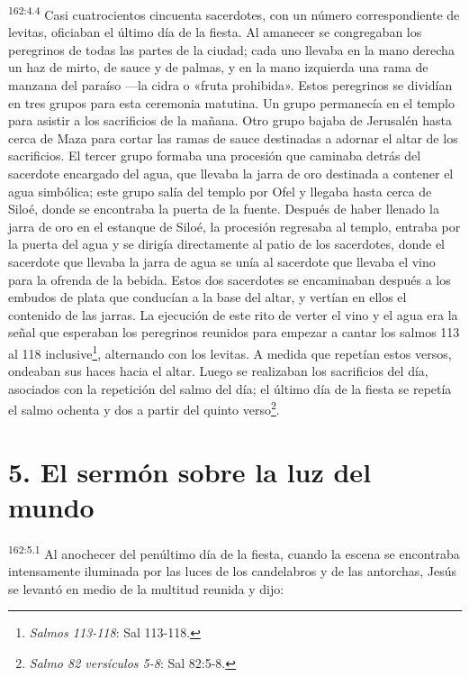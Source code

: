 \par
\textsuperscript{162:4.4} Casi cuatrocientos cincuenta sacerdotes, con un número correspondiente de levitas, oficiaban el último día de la fiesta. Al amanecer se congregaban los peregrinos de todas las partes de la ciudad; cada uno llevaba en la mano derecha un haz de mirto, de sauce y de palmas, y en la mano izquierda una rama de manzana del paraíso ---la cidra o «fruta prohibida». Estos peregrinos se dividían en tres grupos para esta ceremonia matutina. Un grupo permanecía en el templo para asistir a los sacrificios de la mañana. Otro grupo bajaba de Jerusalén hasta cerca de Maza para cortar las ramas de sauce destinadas a adornar el altar de los sacrificios. El tercer grupo formaba una procesión que caminaba detrás del sacerdote encargado del agua, que llevaba la jarra de oro destinada a contener el agua simbólica; este grupo salía del templo por Ofel y llegaba hasta cerca de Siloé, donde se encontraba la puerta de la fuente. Después de haber llenado la jarra de oro en el estanque de Siloé, la procesión regresaba al templo, entraba por la puerta del agua y se dirigía directamente al patio de los sacerdotes, donde el sacerdote que llevaba la jarra de agua se unía al sacerdote que llevaba el vino para la ofrenda de la bebida. Estos dos sacerdotes se encaminaban después a los embudos de plata que conducían a la base del altar, y vertían en ellos el contenido de las jarras. La ejecución de este rito de verter el vino y el agua era la señal que esperaban los peregrinos reunidos para empezar a cantar los salmos 113 al 118 inclusive\footnote{\textit{Salmos 113-118}: Sal 113-118.}, alternando con los levitas. A medida que repetían estos versos, ondeaban sus haces hacia el altar. Luego se realizaban los sacrificios del día, asociados con la repetición del salmo del día; el último día de la fiesta se repetía el salmo ochenta y dos a partir del quinto verso\footnote{\textit{Salmo 82 versículos 5-8}: Sal 82:5-8.}.

\section*{5. El sermón sobre la luz del mundo}
\par
\textsuperscript{162:5.1} Al anochecer del penúltimo día de la fiesta, cuando la escena se encontraba intensamente iluminada por las luces de los candelabros y de las antorchas, Jesús se levantó en medio de la multitud reunida y dijo:

